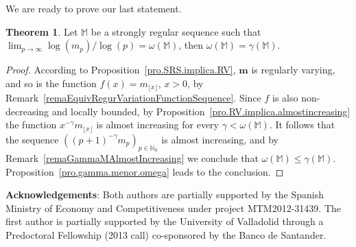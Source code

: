\documentclass[11pt,a4paper]{article}
\theoremstyle{definition}
\newtheorem{theo}{Theorem}[section]
\def\oo{\infty}
\def\ri{\rightarrow}
\def\o{\omega}
\def\ga{\gamma}
\def\N{\mathbb{N}}
\def\M{\mathbb{M}}
\def\bm{\boldsymbol{m}}
\begin{document}
We are ready to prove our last statement.

\begin{theo}
 Let $\M$ be a strongly regular sequence such that $\lim_{p\ri\oo} \log(m_p)/\log(p)=\o(\M)$, then $\o(\M)=\gamma(\M)$.
\end{theo}

\begin{proof}
According to Proposition~\ref{pro.SRS.implica.RV}, $\bm$ is regularly varying, and so is the function $f(x)=m_{\lfloor x\rfloor}$, $x>0$, by Remark~\ref{remaEquivRegurVariationFunctionSequence}. Since $f$ is also non-decreasing and locally bounded, by Proposition~\ref{pro.RV.implica.almostincreasing} the function $x^{-\ga} m_{\lfloor x \rfloor}$ is almost increasing for every $\ga<\o(\M)$.
It follows that the sequence $\left((p+1)^{-\ga}m_{p}\right)_{p\in\N_0}$ is almost increasing, and by
Remark~\ref{remaGammaMAlmostIncreasing} we conclude that $\o(\M)\leq\ga(\M)$. Proposition~\ref{pro.gamma.menor.omega} leads to the conclusion.
\end{proof}

\noindent\textbf{Acknowledgements}: Both authors are partially supported by the Spanish Ministry of Economy and Competitiveness under project MTM2012-31439. The first author is partially supported by the University of Valladolid through a Predoctoral Fellowship (2013 call) co-sponsored by the Banco de Santander.
\end{document}
